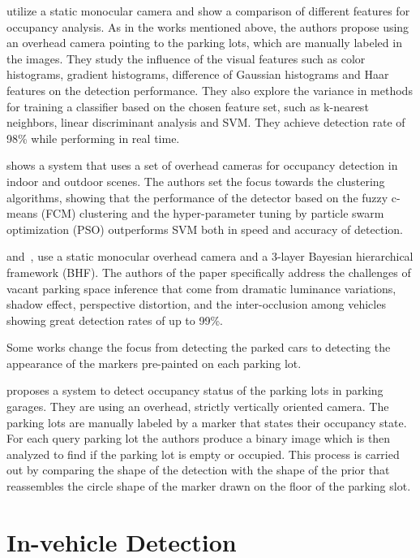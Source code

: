 \citet{tschentscher} utilize a static monocular camera and show a comparison
of different features for occupancy analysis. As in the works mentioned above,
the authors propose using an overhead camera pointing to the parking lots,
which are manually labeled in the images. They study the influence of the
visual features such as color histograms, gradient histograms, difference of
Gaussian histograms and Haar features on the detection performance. They also
explore the variance in methods for training a classifier based on the chosen
feature set, such as k-nearest neighbors, linear discriminant analysis and
SVM\@. They achieve detection rate of 98\% while performing in real time.

\citet{ichihashi} shows a system that uses a set of overhead cameras for
occupancy detection in indoor and outdoor scenes. The authors set the focus
towards the clustering algorithms, showing that the performance of the
detector based on the fuzzy c-means (FCM) clustering and the hyper-parameter
tuning by particle swarm optimization (PSO) outperforms SVM both in speed and
accuracy of detection.

\citet{chingchun10} and~\citet{chingjao10}, use a static monocular overhead
camera and a 3-layer Bayesian hierarchical framework (BHF). The authors of the
paper specifically address the challenges of vacant parking space inference
that come from dramatic luminance variations, shadow effect, perspective
distortion, and the inter-occlusion among vehicles showing great detection
rates of up to 99\%.

Some works change the focus from detecting the parked cars to detecting the
appearance of the markers pre-painted on each parking lot.

\citet{yusnita12} proposes a system to detect occupancy status of the parking
lots in parking garages. They are using an overhead, strictly vertically
oriented camera. The parking lots are manually labeled by a marker that states
their occupancy state. For each query parking lot the authors produce a binary
image which is then analyzed to find if the parking lot is empty or occupied.
This process is carried out by comparing the shape of the detection with the
shape of the prior that reassembles the circle shape of the marker drawn on
the floor of the parking slot.


\section*{In-vehicle Detection} %
\label{sec:in_vehicle_detection}

